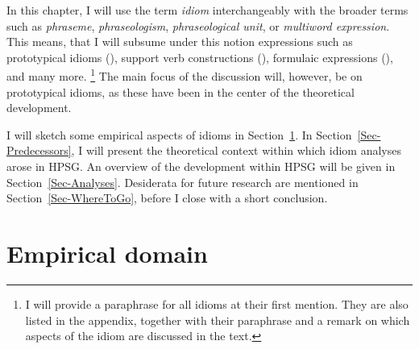 \documentclass[output=paper
                ,modfonts
                ,nonflat
	        ,collection
	        ,collectionchapter
	        ,collectiontoclongg
 	        ,biblatex
                ,babelshorthands
                ,newtxmath
                ,draftmode
                ,colorlinks, citecolor=brown
]{./langsci/langscibook}
\begin{document}
In this chapter, I will use the term \emph{idiom} interchangeably with the broader terms such as \emph{phraseme}, \emph{phraseologism}, \emph{phraseological unit}, or \emph{multiword expression}. This means, that I will subsume under this notion expressions such as prototypical idioms (), support verb constructions (), formulaic expressions (), and many more.%
\footnote{I will provide a paraphrase for all idioms at their first mention. They are also listed in the appendix, together with their paraphrase and a remark on which aspects of the idiom are discussed in the text.}
The main focus of the discussion will, however, be on prototypical idioms, as these have been in the center of the theoretical development.

I will sketch some empirical aspects of idioms in Section~\ref{Sec-EmpiricalDomain}.
In Section~\ref{Sec-Predecessors}, I will present the theoretical context within which idiom analyses arose in HPSG.
An overview of the development within HPSG will be given in Section~\ref{Sec-Analyses}. 
Desiderata for future research are mentioned in Section~\ref{Sec-WhereToGo}, before I close with a short conclusion.

\section{Empirical domain}
\label{Sec-EmpiricalDomain}

\end{document}
